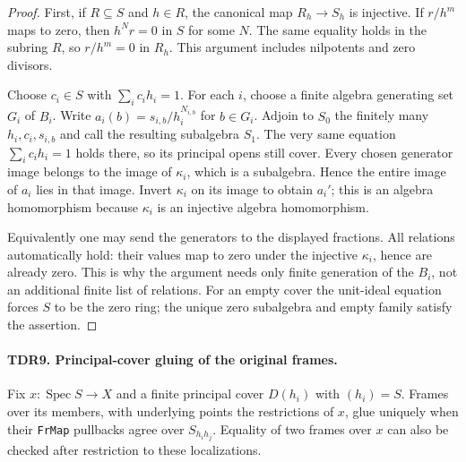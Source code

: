 \documentclass[11pt,a4paper]{article}
\numberwithin{equation}{section}
\theoremstyle{remark}\newtheorem{remark}[theorem]{Remark}
\begin{document}
\begin{proof}
First, if \(R\subseteq S\) and \(h\in R\), the canonical
map \(R_h\to S_h\) is injective.  If \(r/h^m\) maps to
zero, then \(h^N r=0\) in \(S\) for some \(N\).
The same equality holds in the subring \(R\), so \(r/h^m=0\)
in \(R_h\).  This argument includes nilpotents and zero divisors.

Choose \(c_i\in S\) with \(\sum_i c_i h_i=1\).
For each \(i\), choose a finite algebra generating set \(G_i\)
of \(B_i\).  Write
\(a_i(b)=s_{i,b}/h_i^{N_{i,b}}\) for \(b\in G_i\).
Adjoin to \(S_0\) the finitely many \(h_i,c_i,s_{i,b}\)
and call the resulting subalgebra \(S_1\).  The very same
equation \(\sum_i c_i h_i=1\) holds there, so its principal
opens still cover.  Every chosen generator image belongs to the
image of \(\kappa_i\), which is a subalgebra.  Hence the entire
image of \(a_i\) lies in that image.  Invert \(\kappa_i\)
on its image to obtain \(a_i'\); this is an algebra homomorphism
because \(\kappa_i\) is an injective algebra homomorphism.

Equivalently one may send the generators to the displayed fractions.
All relations automatically hold: their values map to zero under
the injective \(\kappa_i\), hence are already zero.  This is why
the argument needs only finite generation of the \(B_i\), not
an additional finite list of relations.  For an empty cover the
unit-ideal equation forces \(S\) to be the zero ring; the unique
zero subalgebra and empty family satisfy the assertion.
\end{proof}

\paragraph{TDR9. Principal-cover gluing of the original frames.}
\label{claim:TDR9}
Fix \(x:\operatorname{Spec}S\to X\) and a finite principal
cover \(D(h_i)\) with \((h_i)=S\).  Frames over its members,
with underlying points the restrictions of \(x\), glue uniquely
when their \texttt{Fr\allowbreak Map} pullbacks agree over
\(S_{h_i h_j}\).  Equality of two frames over \(x\) can also
be checked after restriction to these localizations.
\end{document}
